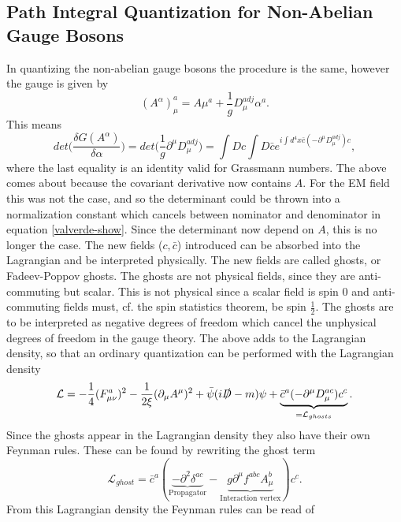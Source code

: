 \subsection*{Path Integral Quantization for Non-Abelian Gauge Bosons}
In quantizing the non-abelian gauge bosons the procedure is the same, however the gauge is given by
\begin{equation}
	(A^\alpha)_\mu^a=A\mu^a+\frac{1}{g}D_\mu^{adj}\alpha^a.
\end{equation} 
This means
\begin{equation}
	det\bigg(\frac{\delta G(A^\alpha)}{\delta \alpha}\bigg)=det\bigg(\frac{1}{g}\partial^\mu D^{adj}_\mu\bigg)=\int Dc\int D\bar{c} e^{i\int d^4x \bar{c}(-\partial^\mu D^{adj}_\mu)c},
\end{equation} 
where the last equality is an identity valid for Grassmann numbers. The above comes about because the covariant derivative now contains $A$. For the EM field this was not the case, and so the determinant could be thrown into a normalization constant which cancels between nominator and denominator in equation \eqref{valverde-show}. Since the determinant now depend on $A$, this is no longer the case. The new fields ($c,\bar{c}$) introduced can be absorbed into the Lagrangian and be interpreted physically. The new fields are called ghosts, or Fadeev-Poppov ghosts. The ghosts are not physical fields, since they are anti-commuting but scalar. This is not physical since a scalar field is spin 0 and anti-commuting fields must, cf. the spin statistics theorem, be spin $\frac{1}{2}$. The ghosts are to be interpreted as negative degrees of freedom which cancel the  unphysical degrees of freedom in the gauge theory. The above adds to the Lagrangian density, so that an ordinary quantization can be performed with the Lagrangian density
\begin{equation}
	\mathcal{L}=-\frac{1}{4}(F^a_{\mu\nu})^2-\frac{1}{2\xi}(\partial_\mu A^\mu)^2+\bar{\psi}(i \slashed D-m)\psi+\underbrace{\bar{c}^a(-\partial^\mu D_\mu^{ac})c^c}_{=\mathcal{L}_{ghosts}}.
\end{equation} 
Since the ghosts appear in the Lagrangian density they also have their own Feynman rules. These can be found by rewriting the ghost term
\begin{equation}
	\mathcal{L}_{ghost}=\bar{c}^a(\underbrace{-\partial^2\delta^{ac}}_{\text{Propagator}}-\underbrace{g\partial^\mu f^{abc}A_\mu^b}_{\text{Interaction vertex}})c^c.
\end{equation} 
From this Lagrangian density the Feynman rules can be read of
